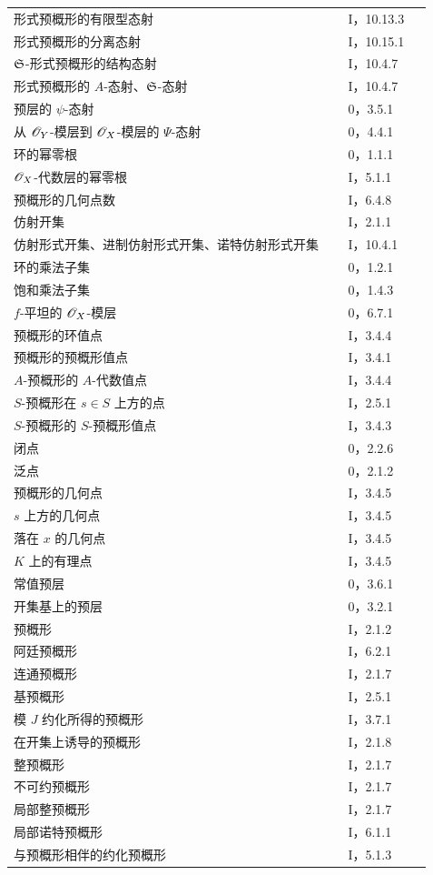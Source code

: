\begin{longtable}{@{}p{0.76\linewidth}p{0.19\linewidth}@{}}
形式预概形的有限型态射&I，10.13.3\\
形式预概形的分离态射&I，10.15.1\\
$\mathfrak S$-形式预概形的结构态射&I，10.4.7\\
形式预概形的 $A$-态射、$\mathfrak S$-态射&I，10.4.7\\
预层的 $\psi$-态射&0，3.5.1\\
从 $\mathscr O_Y$-模层到 $\mathscr O_X$-模层的 $\Psi$-态射&0，4.4.1\\
环的幂零根&0，1.1.1\\
$\mathscr O_X$-代数层的幂零根&I，5.1.1\\
预概形的几何点数&I，6.4.8\\
仿射开集&I，2.1.1\\
仿射形式开集、进制仿射形式开集、诺特仿射形式开集&I，10.4.1\\
环的乘法子集&0，1.2.1\\
饱和乘法子集&0，1.4.3\\
$f$-平坦的 $\mathscr O_X$-模层&0，6.7.1\\
预概形的环值点&I，3.4.4\\
预概形的预概形值点&I，3.4.1\\
$A$-预概形的 $A$-代数值点&I，3.4.4\\
$S$-预概形在 $s\in S$ 上方的点&I，2.5.1\\
$S$-预概形的 $S$-预概形值点&I，3.4.3\\
闭点&0，2.2.6\\
泛点&0，2.1.2\\
预概形的几何点&I，3.4.5\\
$s$ 上方的几何点&I，3.4.5\\
落在 $x$ 的几何点&I，3.4.5\\
$K$ 上的有理点&I，3.4.5\\
常值预层&0，3.6.1\\
开集基上的预层&0，3.2.1\\
预概形&I，2.1.2\\
阿廷预概形&I，6.2.1\\
连通预概形&I，2.1.7\\
基预概形&I，2.5.1\\
模 $J$ 约化所得的预概形&I，3.7.1\\
在开集上诱导的预概形&I，2.1.8\\
整预概形&I，2.1.7\\
不可约预概形&I，2.1.7\\
局部整预概形&I，2.1.7\\
局部诺特预概形&I，6.1.1\\
与预概形相伴的约化预概形&I，5.1.3\\

\end{longtable}
